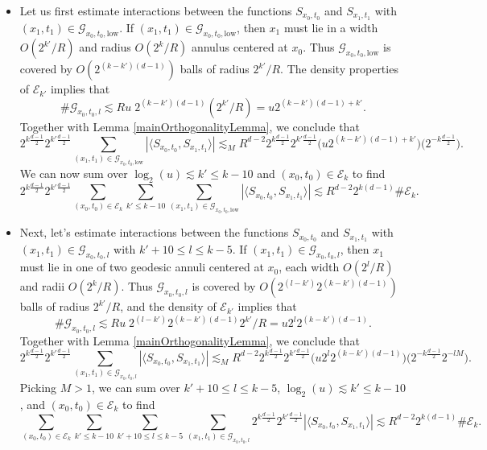 \begin{itemize}
    \item Let us first estimate interactions between the functions ${S\!}_{x_0,t_0}$ and ${S\!}_{x_1,t_1}$ with $(x_1,t_1) \in \mathcal{G}_{x_0,t_0,\text{low}}$. If $(x_1,t_1) \in \mathcal{G}_{x_0,t_0,\text{low}}$, then $x_1$ must lie in a width $O(2^{k'} / R)$ and radius $O(2^k / R)$ annulus centered at $x_0$. Thus $\mathcal{G}_{x_0,t_0,\text{low}}$ is covered by $O( 2^{(k-k')(d-1)} )$ balls of radius $2^{k'} / R$. The density properties of $\mathcal{E}_{k'}$ implies that
    \[ \# \mathcal{G}_{x_0,t_0,l} \lesssim Ru\; 2^{(k-k')(d-1)} (2^{k'} / R) = u 2^{(k-k')(d-1) + k'}. \]
    Together with Lemma \ref{mainOrthogonalityLemma}, we conclude that
    \[ 2^{k \frac{d-1}{2}} 2^{k' \frac{d-1}{2}} \sum_{(x_1,t_1) \in \mathcal{G}_{x_0,t_0,\text{low}}} |\langle {S\!}_{x_0,t_0}, {S\!}_{x_1,t_1} \rangle| \lesssim_M R^{d-2} 2^{k \frac{d-1}{2}} 2^{k' \frac{d-1}{2}} \Big( u 2^{(k-k')(d-1) + k'} \Big) \Big( 2^{-k \frac{d-1}{2}} \Big). \]
    We can now sum over $\log_2(u) \lesssim k' \leq k - 10$ and $(x_0,t_0) \in \mathcal{E}_k$ to find
    \[ 2^{k \frac{d-1}{2}} 2^{k' \frac{d-1}{2}} \sum_{(x_0,t_0) \in \mathcal{E}_k} \sum_{k' \leq k - 10} \sum_{(x_1,t_1) \in \mathcal{G}_{x_0,t_0,\text{low}}} |\langle {S\!}_{x_0,t_0}, {S\!}_{x_1,t_1} \rangle| \lesssim R^{d-2} 2^{k (d-1)} \# \mathcal{E}_k. \]

    \item Next, let's estimate interactions between the functions ${S\!}_{x_0,t_0}$ and ${S\!}_{x_1,t_1}$ with $(x_1,t_1) \in \mathcal{G}_{x_0,t_0,l}$ with $k' + 10 \leq l \leq k - 5$. If $(x_1,t_1) \in \mathcal{G}_{x_0,t_0,l}$, then $x_1$ must lie in one of two geodesic annuli centered at $x_0$, each width $O(2^l/R)$ and radii $O(2^k / R)$. Thus $\mathcal{G}_{x_0,t_0,l}$ is covered by $O( 2^{(l-k')} 2^{(k-k')(d-1)} )$ balls of radius $2^{k'} / R$, and the density of $\mathcal{E}_{k'}$ implies that
    \[ \# \mathcal{G}_{x_0,t_0,l} \lesssim Ru\; 2^{(l-k')} 2^{(k-k')(d-1)} 2^{k'} / R = u 2^{l} 2^{(k-k')(d-1)}. \]
    Together with Lemma \ref{mainOrthogonalityLemma}, we conclude that
    \[ 2^{k \frac{d-1}{2}} 2^{k' \frac{d-1}{2}} \sum_{(x_1,t_1) \in \mathcal{G}_{x_0,t_0,l}} |\langle {S\!}_{x_0,t_0}, {S\!}_{x_1,t_1} \rangle| \lesssim_M R^{d-2} 2^{k \frac{d-1}{2}} 2^{k' \frac{d-1}{2}} \Big( u 2^{l} 2^{(k-k')(d-1)} \Big) \Big( 2^{-k \frac{d-1}{2}} 2^{-lM} \Big). \]
    Picking $M > 1$, we can sum over $k' + 10 \leq l \leq k - 5$, $\log_2(u) \lesssim k' \leq k - 10$, and $(x_0,t_0) \in \mathcal{E}_k$ to find
    \[ \sum_{(x_0,t_0) \in \mathcal{E}_k} \sum_{k' \leq k - 10} \sum_{k'+10 \leq l \leq k - 5} \sum_{(x_1,t_1) \in \mathcal{G}_{x_0,t_0,l}} 2^{k \frac{d-1}{2}} 2^{k' \frac{d-1}{2}} |\langle {S\!}_{x_0,t_0}, {S\!}_{x_1,t_1} \rangle| \lesssim R^{d-2} 2^{k (d-1)} \# \mathcal{E}_k. \]


\end{itemize}
